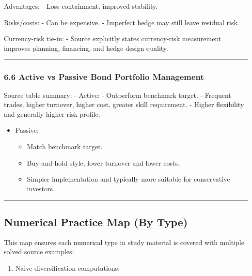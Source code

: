 \documentclass[
]{article}
\providecommand{\tightlist}{%
  \setlength{\itemsep}{0pt}\setlength{\parskip}{0pt}}
\begin{document}
Advantages: - Loss containment, improved stability.

Risks/costs: - Can be expensive. - Imperfect hedge may still leave
residual risk.

Currency-risk tie-in: - Source explicitly states currency-risk
measurement improves planning, financing, and hedge design quality.

\begin{center}\rule{0.5\linewidth}{0.5pt}\end{center}

\hypertarget{active-vs-passive-bond-portfolio-management}{%
\subsubsection{6.6 Active vs Passive Bond Portfolio
Management}\label{active-vs-passive-bond-portfolio-management}}

Source table summary: - Active: - Outperform benchmark target. -
Frequent trades, higher turnover, higher cost, greater skill
requirement. - Higher flexibility and generally higher risk profile.

\begin{itemize}
\tightlist
\item
  Passive:

  \begin{itemize}
  \tightlist
  \item
    Match benchmark target.
  \item
    Buy-and-hold style, lower turnover and lower costs.
  \item
    Simpler implementation and typically more suitable for conservative
    investors.
  \end{itemize}
\end{itemize}

\begin{center}\rule{0.5\linewidth}{0.5pt}\end{center}

\hypertarget{numerical-practice-map-by-type}{%
\subsection{Numerical Practice Map (By
Type)}\label{numerical-practice-map-by-type}}

This map ensures each numerical type in study material is covered with
multiple solved source examples:

\begin{enumerate}
\def\labelenumi{\arabic{enumi}.}
\tightlist
\item
  Naive diversification computations:
\end{enumerate}
\end{document}
